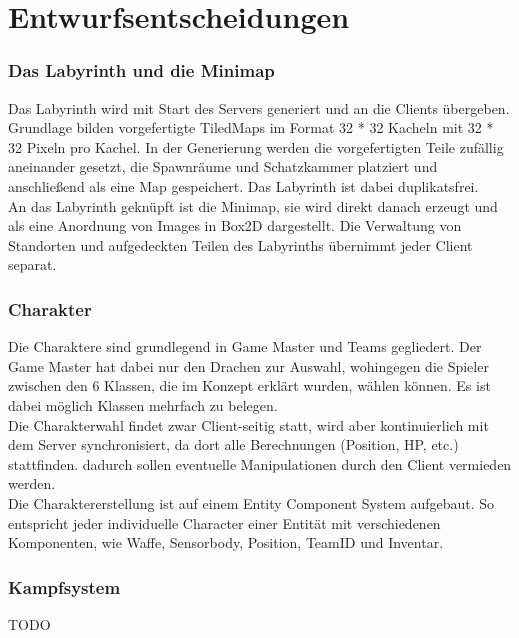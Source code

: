 \documentclass[10pt,a4paper,notitlepage]{scrreprt}
\begin{document}
	\section{Entwurfsentscheidungen}

		\subsubsection{Das Labyrinth und die Minimap}
		
		Das Labyrinth wird mit Start des Servers generiert und an die Clients übergeben. Grundlage bilden vorgefertigte TiledMaps im Format 32 * 32 Kacheln mit 32 * 32 Pixeln pro Kachel. In der Generierung werden die vorgefertigten Teile zufällig aneinander gesetzt, die Spawnräume und Schatzkammer platziert und anschließend als eine Map gespeichert. Das Labyrinth ist dabei duplikatsfrei.\\
		An das Labyrinth geknüpft ist die Minimap, sie wird direkt danach erzeugt und als eine Anordnung von Images in Box2D dargestellt. Die Verwaltung von Standorten und aufgedeckten Teilen des Labyrinths übernimmt jeder Client separat.\\
		
		\subsubsection{Charakter}
		
		Die Charaktere sind grundlegend in Game Master und Teams gegliedert. Der Game Master hat dabei nur den Drachen zur Auswahl, wohingegen die Spieler zwischen den 6 Klassen, die im Konzept erklärt wurden, wählen können. Es ist dabei möglich Klassen mehrfach zu belegen.\\
		Die Charakterwahl findet zwar Client-seitig statt, wird aber kontinuierlich mit dem Server synchronisiert, da dort alle Berechnungen (Position, HP, etc.) stattfinden. dadurch sollen eventuelle Manipulationen durch den Client vermieden werden.\\
		Die Charaktererstellung ist auf einem Entity Component System aufgebaut. So entspricht jeder individuelle Character einer Entität mit verschiedenen Komponenten, wie Waffe, Sensorbody, Position, TeamID und Inventar.\\
		
		\subsubsection{Kampfsystem} 
		TODO
		
\end{document}

